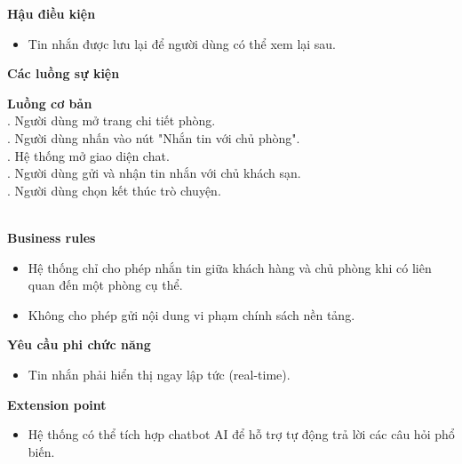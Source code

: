 \textbf{Hậu điều kiện}
\begin{itemize}
    \item Tin nhắn được lưu lại để người dùng có thể xem lại sau.
\end{itemize}

\textbf{Các luồng sự kiện}

\begin{small}
\textbf{Luồng cơ bản}\\
. Người dùng mở trang chi tiết phòng.\\
. Người dùng nhấn vào nút "Nhắn tin với chủ phòng".\\
. Hệ thống mở giao diện chat.\\
. Người dùng gửi và nhận tin nhắn với chủ khách sạn.\\
. Người dùng chọn kết thúc trò chuyện.\\
\end{small}\\
\textbf{\indent Business rules}
\begin{itemize}
    \item Hệ thống chỉ cho phép nhắn tin giữa khách hàng và chủ phòng khi có liên quan đến một phòng cụ thể.
    \item Không cho phép gửi nội dung vi phạm chính sách nền tảng.
\end{itemize}

\textbf{Yêu cầu phi chức năng}
\begin{itemize}
    \item Tin nhắn phải hiển thị ngay lập tức (real-time).
\end{itemize}

\textbf{Extension point}
\begin{itemize}
    \item Hệ thống có thể tích hợp chatbot AI để hỗ trợ tự động trả lời các câu hỏi phổ biến.
\end{itemize}



